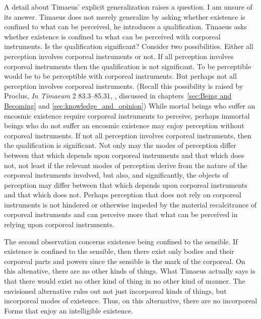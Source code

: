 A detail about Timaeus' explicit generalization raises a question. I am unsure of its answer. Timaeus does not merely generalize by asking whether existence is confined to what can be perceived, he introduces a qualification. Timaeus asks whether existence is confined to what can be perceived with corporeal instruments. Is the qualification significant? Consider two possibilities. Either all perception involves corporeal instruments or not. If all perception involves corporeal instruments then the qualification is not significant. To be perceptible would be to be perceptible with corporeal instruments. But perhaps not all perception involves corporeal instruments. (Recall this possibility is raised by Proclus, \emph{In Timaeum} 2 83.3–85.31, \citealt{Diehl:1903re}, discussed in chapters~\ref{sec:Being and Becoming} and \ref{sec:knowledge_and_opinion}) While mortal beings who suffer an encosmic existence require corporeal instruments to perceive, perhaps immortal beings who do not suffer an encosmic existence may enjoy perception without corporeal instruments. If not all perception involves corporeal instruments, then the qualification is significant. Not only may the modes of perception differ between that which depends upon corporeal instruments and that which does not, not least if the relevant modes of perception derive from the nature of the corporeal instruments involved, but also, and significantly, the objects of perception may differ between that which depends upon corporeal instruments and that which does not. Perhaps perception that does not rely on corporeal instruments is not hindered or otherwise impeded by the material recalcitrance of corporeal instruments and can perceive more that what can be perceived in relying upon corporeal instruments. 

The second observation concerns existence being confined to the sensible. If existence is confined to the sensible, then there exist only bodies and their corporeal parts and powers since the sensible is the mark of the corporeal. On this altenative, there are no other kinds of things. What Timaeus actually says is that there would exist no other kind of thing in no other kind of manner. The envisioned alternative rules out not just incorporeal kinds of things, but incorporeal modes of existence. Thus, on this alternative, there are no incorporeal Forms that enjoy an intelligible existence.

